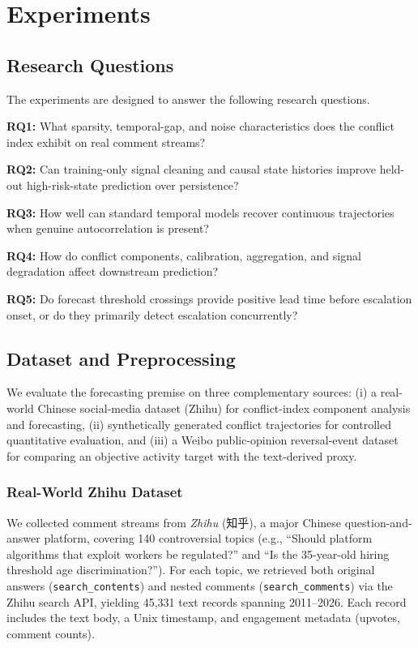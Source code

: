 \documentclass[journal]{IEEEtran}
\begin{document}
\section{Experiments}\label{sec:experiments}

\subsection{Research Questions}

The experiments are designed to answer the following research questions.

\noindent\textbf{RQ1:} What sparsity, temporal-gap, and noise characteristics does the conflict index exhibit on real comment streams?

\noindent\textbf{RQ2:} Can training-only signal cleaning and causal state histories improve held-out high-risk-state prediction over persistence?

\noindent\textbf{RQ3:} How well can standard temporal models recover continuous trajectories when genuine autocorrelation is present?

\noindent\textbf{RQ4:} How do conflict components, calibration, aggregation, and signal degradation affect downstream prediction?

\noindent\textbf{RQ5:} Do forecast threshold crossings provide positive lead time before escalation onset, or do they primarily detect escalation concurrently?

\subsection{Dataset and Preprocessing}
\label{sec:dataset}

We evaluate the forecasting premise on three complementary sources: (i) a real-world Chinese social-media dataset (Zhihu) for conflict-index component analysis and forecasting, (ii) synthetically generated conflict trajectories for controlled quantitative evaluation, and (iii) a Weibo public-opinion reversal-event dataset for comparing an objective activity target with the text-derived proxy.

\subsubsection{Real-World Zhihu Dataset}

We collected comment streams from \emph{Zhihu} (知乎), a major Chinese question-and-answer platform, covering 140 controversial topics (e.g., ``Should platform algorithms that exploit workers be regulated?'' and ``Is the 35-year-old hiring threshold age discrimination?''). For each topic, we retrieved both original answers (\texttt{search\_contents}) and nested comments (\texttt{search\_comments}) via the Zhihu search API, yielding 45,331 text records spanning 2011--2026. Each record includes the text body, a Unix timestamp, and engagement metadata (upvotes, comment counts).
\end{document}
